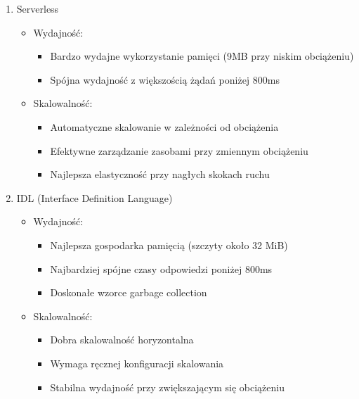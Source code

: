 \documentclass[runningheads,12pt]{llncs}
\begin{document}
\begin{enumerate}
    \item Serverless
    \begin{itemize}
        \item Wydajność:
        \begin{itemize}
            \item Bardzo wydajne wykorzystanie pamięci (9MB przy niskim obciążeniu)
            \item Spójna wydajność z większością żądań poniżej 800ms
        \end{itemize}
        \item Skalowalność:
        \begin{itemize}
            \item Automatyczne skalowanie w zależności od obciążenia
            \item Efektywne zarządzanie zasobami przy zmiennym obciążeniu
            \item Najlepsza elastyczność przy nagłych skokach ruchu
        \end{itemize}
    \end{itemize}

    \item IDL (Interface Definition Language)
    \begin{itemize}
        \item Wydajność:
        \begin{itemize}
            \item Najlepsza gospodarka pamięcią (szczyty około 32 MiB)
            \item Najbardziej spójne czasy odpowiedzi poniżej 800ms
            \item Doskonałe wzorce garbage collection
        \end{itemize}
        \item Skalowalność:
        \begin{itemize}
            \item Dobra skalowalność horyzontalna
            \item Wymaga ręcznej konfiguracji skalowania
            \item Stabilna wydajność przy zwiększającym się obciążeniu
        \end{itemize}
    \end{itemize}


\end{enumerate}
\end{document}
